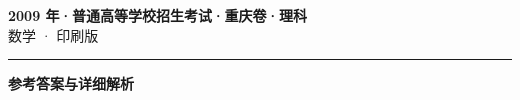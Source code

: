 \documentclass[zihao=5, a4paper]{ctexart}
\begin{document}
\begin{center}
  {\Large\bfseries 2009 年·普通高等学校招生考试·重庆卷·理科}\\[4pt]
  {\large 数学 · 印刷版}
\end{center}
\medskip
{}

\par\bigskip\hrule\bigskip
{}
\begin{center}{\large\bfseries 参考答案与详细解析}\end{center}
\smallskip

\end{document}
